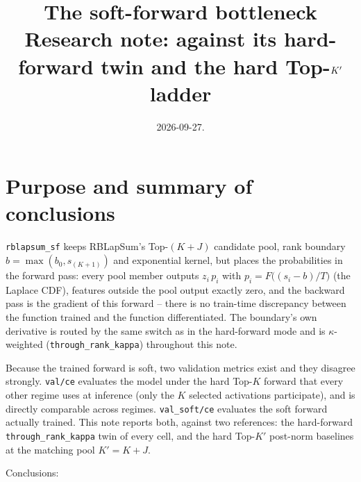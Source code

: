 \documentclass[11pt,a4paper]{article}
\title{The soft-forward bottleneck\\[2pt]
\large Research note: \code{rblapsum\_sf} against its hard-forward twin and the
hard Top-$\Kp$ ladder}
\author{}
\date{2026-09-27.}
\newcommand{\code}[1]{\texttt{#1}}
\newcommand{\Kp}{K'}
\begin{document}
\maketitle
\vspace{-2em}

\section{Purpose and summary of conclusions}

\code{rblapsum\_sf} keeps RBLapSum's Top-$(K{+}J)$ candidate pool, rank
boundary $b = \max(b_0, s_{(K+1)})$ and exponential kernel, but places the
probabilities in the forward pass: every pool member outputs
$z_i\,p_i$ with $p_i = F\!\big((s_i - b)/T\big)$ (the Laplace CDF), features
outside the pool output exactly zero, and the backward pass is the gradient of
this forward -- there is no train-time discrepancy between the function
trained and the function differentiated. The boundary's own derivative is
routed by the same switch as in the hard-forward mode and is
$\kappa$-weighted (\code{through\_rank\_kappa}) throughout this note.

Because the trained forward is soft, two validation metrics exist and they
disagree strongly. \code{val/ce} evaluates the model under the hard Top-$K$
forward that every other regime uses at inference (only the $K$ selected
activations participate), and is directly comparable across regimes.
\code{val\_soft/ce} evaluates the soft forward actually trained. This note
reports both, against two references: the hard-forward
\code{through\_rank\_kappa} twin of every cell, and the hard Top-$\Kp$
post-norm baselines at the matching pool $\Kp = K+J$.

Conclusions:
\end{document}
